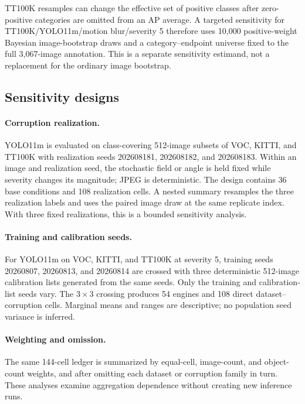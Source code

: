 TT100K resamples can change the effective set of positive classes after
zero-positive categories are omitted from an AP average. A targeted sensitivity
for TT100K/YOLO11m/motion blur/severity 5 therefore uses 10,000 positive-weight
Bayesian image-bootstrap draws and a category--endpoint universe fixed to the
full 3,067-image annotation. This is a separate sensitivity estimand, not a
replacement for the ordinary image bootstrap.

\subsection{Sensitivity designs}
\label{sec:sensitivities}

\paragraph{Corruption realization.}
YOLO11m is evaluated on class-covering 512-image subsets of VOC, KITTI, and
TT100K with realization seeds 202608181, 202608182, and 202608183. Within an
image and realization seed, the stochastic field or angle is held fixed while
severity changes its magnitude; JPEG is deterministic. The design contains 36
base conditions and 108 realization cells. A nested summary resamples the three
realization labels and uses the paired image draw at the same replicate index.
With three fixed realizations, this is a bounded sensitivity analysis.

\paragraph{Training and calibration seeds.}
For YOLO11m on VOC, KITTI, and TT100K at severity 5, training seeds 20260807,
20260813, and 20260814 are crossed with three deterministic 512-image
calibration lists generated from the same seeds. Only the training and
calibration-list seeds vary. The $3\times3$ crossing produces 54 engines and
108 direct dataset--corruption cells. Marginal means and ranges are descriptive;
no population seed variance is inferred.

\paragraph{Weighting and omission.}
The same 144-cell ledger is summarized by equal-cell, image-count, and
object-count weights, and after omitting each dataset or corruption family in
turn. These analyses examine aggregation dependence without creating new
inference runs.

